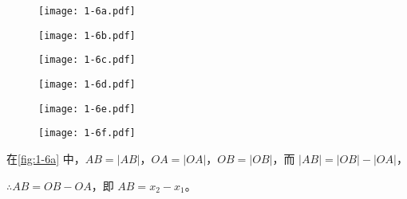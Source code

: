 \begin{figure}
  \begin{minipage}{0.1\linewidth}
    \subcaption{}\label{fig:1-6a}
  \end{minipage}%
  \begin{minipage}{0.5\linewidth}
    \texttt{[image: 1-6a.pdf]}
  \end{minipage}\par
  \begin{minipage}{0.1\linewidth}
    \subcaption{}\label{fig:1-6b}
  \end{minipage}%
  \begin{minipage}{0.5\linewidth}
    \texttt{[image: 1-6b.pdf]}
  \end{minipage}\par
  \begin{minipage}{0.1\linewidth}
    \subcaption{}\label{fig:1-6c}
  \end{minipage}%
  \begin{minipage}{0.5\linewidth}
    \texttt{[image: 1-6c.pdf]}
  \end{minipage}\par
  \begin{minipage}{0.1\linewidth}
    \subcaption{}\label{fig:1-6d}
  \end{minipage}%
  \begin{minipage}{0.5\linewidth}
    \texttt{[image: 1-6d.pdf]}
  \end{minipage}\par
  \begin{minipage}{0.1\linewidth}
    \subcaption{}\label{fig:1-6e}
  \end{minipage}%
  \begin{minipage}{0.5\linewidth}
    \texttt{[image: 1-6e.pdf]}
  \end{minipage}\par
  \begin{minipage}{0.1\linewidth}
    \subcaption{}\label{fig:1-6f}
  \end{minipage}%
  \begin{minipage}{0.5\linewidth}
    \texttt{[image: 1-6f.pdf]}
  \end{minipage}\par
  \caption{}\label{fig:1-6}
\end{figure}

在\cref{fig:1-6a} 中，$AB=|AB|$，$OA=|OA|$，$OB=|OB|$，而 $|AB|=|OB|-|OA|$，

$\therefore AB=OB-OA$，即 $AB=x_2-x_1$。


